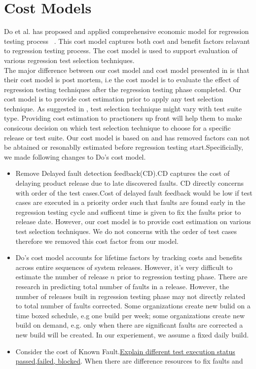 \section{Cost Models}
Do et al. has proposed and applied comprehensive economic model for
regression testing process
~\cite{DBLP:conf/issta/DoR08,DBLP:conf/sigsoft/DoMTR08,DBLP:conf/sigsoft/DoR06,5482587}.
This cost model captures both cost and benefit factors relavant to regression testing process. The cost model is used to support evaluation of various
regression test selection techniques.
\\The major difference between our cost
model and cost model presented in \cite{DBLP:conf/issta/DoR08} is that their
cost model is post mortem, i.e the cost model is to evaluate the effect of
regression testing techniques after the regression testing phase completed.
Our cost model is to provide cost estimation prior to apply any test selection technique. As suggested in \cite{DBLP:conf/sigsoft/DoR06}, test selection technique might vary with test suite type. Providing cost estimation to practioners up front will help them to make consicous decision on which test selection technique to choose for a specific release or test suite.
Our cost model is based on \cite{DBLP:conf/issta/DoR08} and has removed factors
can not be abtained or resonablly estimated before regression testing
start.Specificially, we made following changes to Do's cost
model.\begin{itemize}\item Remove Delayed fault detection feedback(CD).CD
captures the cost of delaying product release due to late discovered faults. CD directly concerns with order of the test cases.Cost of delayed fault feedback would be low if test cases are
executed in a priority order such that faults are found early in the regression
testing cycle and sufficent time is given to fix the faults prior to
release date. However, our cost model is to provide cost estimation on
various test selection techniques. We do not concerns with the order of test
cases therefore we removed this cost factor from our model.\item Do's cost
model accounts for lifetime factors by tracking costs and benefits across entire
sequences of system releases. However, it's very difficult to estimate the
number of release $n$ prior to regression testing phase. There are research in
predicting total number of faults in a
release\cite{DBLP:journals/smr/RajaHH09}. However, the number of releases
built in regression testing phase may not directly related to total number of faults corrected. Some organizations create new bulid on a time boxed schedule, e.g one build per week; some organizations create new build on demand, e.g. only when there are significant faults are corrected a new build will
be created. In our experiement, we assume a fixed daily build. \item Consider
the cost of Known Fault.\underline{Explain different test execution status
passed,failed, blocked}. When there are difference resources to fix faults and
\end{itemize}


